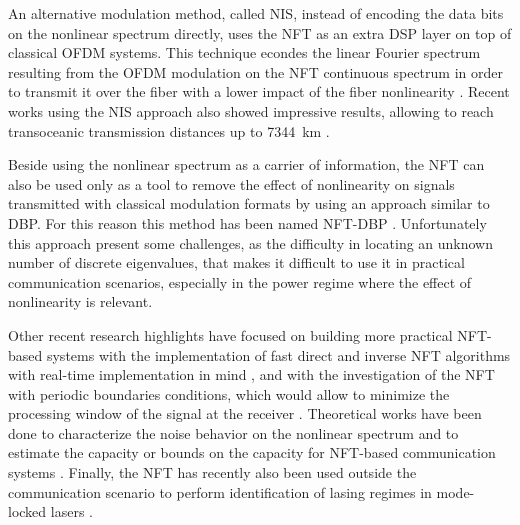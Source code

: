 An alternative modulation method, called \ac{NIS}, instead of encoding the data bits on the nonlinear spectrum directly, uses the \ac{NFT} as an extra \ac{DSP} layer on top of  classical \ac{OFDM} systems. This technique econdes the linear Fourier spectrum resulting from the \ac{OFDM} modulation on the \ac{NFT} continuous spectrum in order to transmit it over the fiber with a lower impact of the fiber nonlinearity \cite{Prilepsky,Le,le2015nonlinear}. Recent works using the \ac{NIS} approach also showed impressive results, allowing to reach transoceanic transmission distances up to \SI{7344}{km} \cite{Le}.

Beside using the nonlinear spectrum as a carrier of information, the \ac{NFT} can also be used only as a tool to remove the effect of nonlinearity on signals transmitted with classical modulation formats by using an approach similar to \ac{DBP}. For this reason this method has been named \ac{NFT}-\ac{DBP} \cite{turitsyna2013digital,wahls2015digital}. Unfortunately this approach present some challenges, as the difficulty in locating an unknown number of discrete eigenvalues, that makes it difficult to use it in practical communication scenarios, especially in the power regime where the effect of nonlinearity is relevant.

Other recent research highlights have focused on building more practical  \ac{NFT}-based systems with the implementation of fast direct and inverse \ac{NFT} algorithms with real-time implementation in mind \cite{wahls2016fiber}, and with the investigation of the \ac{NFT} with periodic boundaries conditions, which would allow to minimize the processing window of the signal at the receiver \cite{kamalian2016periodic, kamalian2016periodic_a,kamalian2016periodic_b}. Theoretical works have been done to
characterize the noise behavior on the nonlinear spectrum \cite{Zhang2,wahls2017second,HongKong,civelli2017noise} and
to estimate the capacity or bounds on the capacity for \ac{NFT}-based communication systems  \cite{derevyanko2016capacity,tavakkolnia2017capacity,zhang2016achievable,shevchenko2015lower,yousefi2015upper}.
Finally, the \ac{NFT} has recently also been used outside the communication scenario to perform identification of lasing regimes in mode-locked lasers \cite{sugavanam2017experimentally}.


